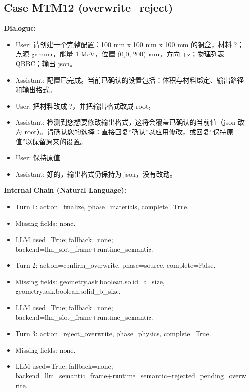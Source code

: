 \documentclass[11pt]{ctexart}
\begin{document}
\subsection{Case MTM12 (overwrite\_reject)}
\textbf{Dialogue:}
\begin{itemize}
\item User: 请创建一个完整配置：100 mm x 100 mm x 100 mm 的铜盒，材料 ?；点源 gamma，能量 1 MeV，位置 (0,0,-200) mm，方向 +z；物理列表 QBBC；输出 json。
\item Assistant: 配置已完成。当前已确认的设置包括：体积与材料绑定、输出路径和输出格式。
\item User: 把材料改成 ?，并把输出格式改成 root。
\item Assistant: 检测到您想要修改输出格式，这将会覆盖已确认的当前值（json 改为 root）。请确认您的选择：直接回复“确认”以应用修改，或回复“保持原值”以保留原来的设置。
\item User: 保持原值
\item Assistant: 好的，输出格式仍保持为 json，没有改动。
\end{itemize}
\textbf{Internal Chain (Natural Language):}
\begin{itemize}
\item Turn 1: action=finalize, phase=materials, complete=True.
\item Missing fields: none.
\item LLM used=True; fallback=none; backend=llm\_slot\_frame+runtime\_semantic.
\item Turn 2: action=confirm\_overwrite, phase=source, complete=False.
\item Missing fields: geometry.ask.boolean.solid\_a\_size, geometry.ask.boolean.solid\_b\_size.
\item LLM used=True; fallback=none; backend=llm\_slot\_frame+runtime\_semantic.
\item Turn 3: action=reject\_overwrite, phase=physics, complete=True.
\item Missing fields: none.
\item LLM used=True; fallback=none; backend=llm\_semantic\_frame+runtime\_semantic+rejected\_pending\_overwrite.
\end{itemize}
\end{document}
